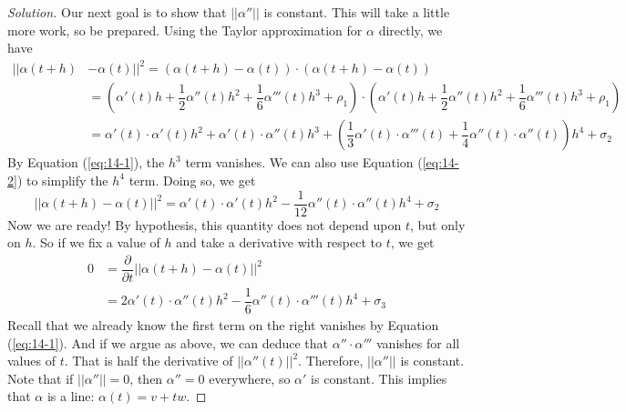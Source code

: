 \documentclass[Shifrin_Solutions_Spring_2018]{subfiles}
\begin{document}
\begin{proof}[Solution]
Our next goal is to show that $||\alpha''||$ is constant. This will take 
a little more work, so be prepared. Using the Taylor
approximation for $\alpha$ directly, we have
\[
\begin{split}
||\alpha(t+h) &-\alpha(t)||^2  = (\alpha(t+h)-\alpha(t)) \cdot (\alpha(t+h)-\alpha(t)) \\
 & = (\alpha'(t) h + \dfrac{1}{2}\alpha''(t) h^2 + 
   \dfrac{1}{6}\alpha'''(t) h^3 + \rho_1)
   \cdot(\alpha'(t) h + \dfrac{1}{2}\alpha''(t) h^2 + 
   \dfrac{1}{6}\alpha'''(t) h^3 + \rho_1)\\
& = \alpha'(t)\cdot \alpha'(t) h^2 + \alpha'(t)\cdot\alpha''(t) h^3 +
   \left( \dfrac{1}{3} \alpha'(t)\cdot\alpha'''(t) + 
   \dfrac{1}{4}\alpha''(t)\cdot \alpha''(t) \right) h^4 + \sigma_2
\end{split}
\]
By Equation (\ref{eq:14-1}), the $h^3$ term vanishes. 
We can also use Equation (\ref{eq:14-2}) to simplify the $h^4$ term. Doing so, we
get
\[
||\alpha(t+h) -\alpha(t)||^2 = \alpha'(t)\cdot \alpha'(t) h^2 
  -\dfrac{1}{12}\alpha''(t)\cdot\alpha''(t) h^4 + \sigma_2
\]
Now we are ready! By hypothesis, this quantity does not depend upon $t$, but only on $h$.
So if we fix a value of $h$ and take a derivative with respect to $t$, we get
\[
\begin{split}
0  & = \dfrac{\partial}{\partial t}\left|\left| \alpha(t+h) -\alpha(t) \right|\right|^2 \\
  & = 2\alpha'(t)\cdot \alpha''(t) h^2 - \dfrac{1}{6}\alpha''(t)\cdot\alpha'''(t)h^4 + \sigma_3
\end{split}
\]
Recall that we already know the first term on the right vanishes by Equation (\ref{eq:14-1}).
And if we argue as above, we can deduce that $\alpha'' \cdot \alpha'''$ vanishes for all
values of $t$. That is half the derivative of $||\alpha''(t)||^2$. 
Therefore, $||\alpha''||$ is constant.\\

Note that if $||\alpha''|| = 0$, then $\alpha''=0$ everywhere, so $\alpha'$ is constant. 
This implies that $\alpha$ is a line: $\alpha(t) = v+ t w$.


\end{proof}
\end{document}
